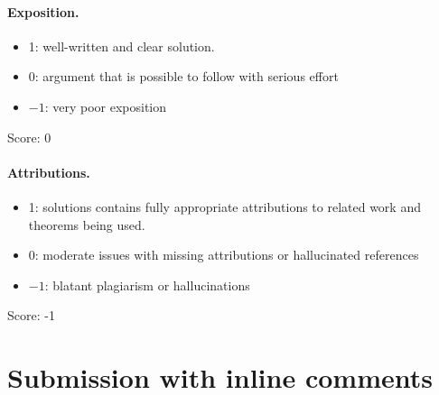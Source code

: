 \documentclass[11pt]{article}
\theoremstyle{definition}
\theoremstyle{remark}
\begin{document}
\paragraph{Exposition.}
\begin{itemize}
	\item  1: well-written and clear solution.
	\item  0: argument that is possible to follow with serious effort
	\item  $-1$: very poor exposition
\end{itemize}

\noindent Score: 0

\paragraph{Attributions.}
\begin{itemize}
	\item  1: solutions contains fully appropriate attributions
		to related work and theorems being used.
	\item  0: moderate issues with missing attributions or hallucinated references
	\item  $-1$: blatant plagiarism or hallucinations
\end{itemize}

\noindent Score: -1

\newpage
\section{Submission with inline comments}


\begin{abstract}
The problem considered here asks for an explicit identification of a reduced stated skein algebra of a punctured bigon with a generalized double of the full-weight quantum Borel algebras, followed by a diagonal quotient giving the simply-connected quantum group. We give a partial answer. At a specified generic parameter we compute the ordered double, its full diagonal quotient, and explicit inverse formulas for triangular quantum matrices. These yield a comparison theorem for an algebra satisfying a precise mixed exchange identity and a vector-space factorization. The proof retains the weight lattice and distinguishes gluing all weight Cartans from gluing only simple-root Cartans. The identification of these hypotheses with the designated skein algebra and its arc conventions remains unresolved; consequently neither requested isomorphism for the original objects is asserted.
\end{abstract}
\end{document}

